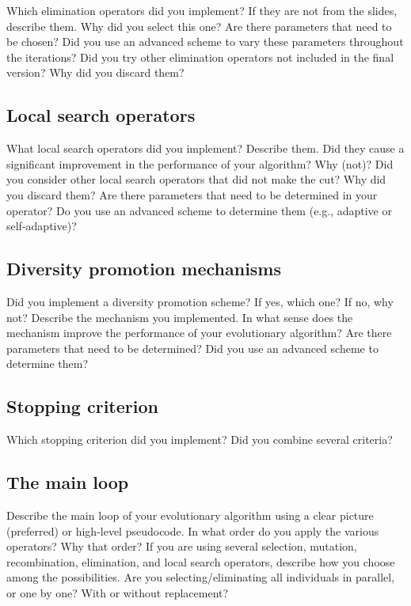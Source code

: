 \documentclass[a4paper,10pt]{article}
\newcommand{\ReplaceMe}[1]{{\color{blue}#1}}
\begin{document}
\ReplaceMe{Which elimination operators did you implement? If they are not from the slides, describe them. Why did you select this one? Are there parameters that need to be chosen? Did you use an advanced scheme to vary these parameters throughout the iterations? Did you try other elimination operators not included in the final version? Why did you discard them?} 

\subsection{Local search operators}\label{ssec:localsearch}

\ReplaceMe{What local search operators did you implement? Describe them. Did they cause a significant improvement in the performance of your algorithm? Why (not)? Did you consider other local search operators that did not make the cut? Why did you discard them? Are there parameters that need to be determined in your operator? Do you use an advanced scheme to determine them (e.g., adaptive or self-adaptive)?}

\subsection{Diversity promotion mechanisms}\label{ssec:diversitypromotion}

\ReplaceMe{Did you implement a diversity promotion scheme? If yes, which one? If no, why not? Describe the mechanism you implemented. In what sense does the mechanism improve the performance of your evolutionary algorithm? Are there parameters that need to be determined? Did you use an advanced scheme to determine them?}

\subsection{Stopping criterion}\label{ssec:stopcriterion}

\ReplaceMe{Which stopping criterion did you implement? Did you combine several criteria?}

\subsection{The main loop}\label{ssec:mainloop}

\ReplaceMe{Describe the main loop of your evolutionary algorithm using a clear picture (preferred) or high-level pseudocode. In what order do you apply the various operators? Why that order? If you are using several selection, mutation, recombination, elimination, and local search operators, describe how you choose among the possibilities. Are you selecting/eliminating all individuals in parallel, or one by one? With or without replacement?}
\end{document}
